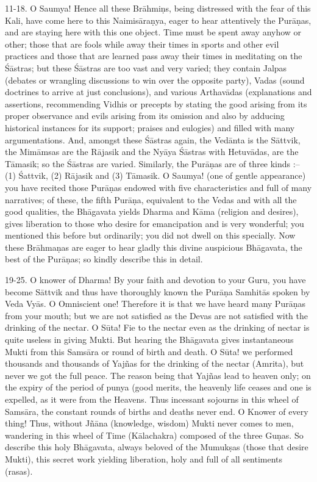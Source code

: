 11-18. O Saumya! Hence all these Br\=ahmi\d{n}s, being distressed with the fear of this Kali, have come here to this Naimis\=ara\d{n}ya, eager to hear attentively the Pur\=a\d{n}as, and are staying here with this one object. Time must be spent away anyhow or other; those that are fools while away their times in sports and other evil practices and those that are learned pass away their times in meditating on the \'S\=astras; but these \'S\=astras are too vast and very varied; they contain Jalpas (debates or wrangling discussions to win over the opposite party), Vadas (sound doctrines to arrive at just conclusions), and various Arthav\=adas (explanations and assertions, recommending Vidhis or precepts by stating the good arising from its proper observance and evils arising from its omission and also by adducing historical instances for its support; praises and eulogies) and filled with many argumentations. And, amongst these \'S\=astras again, the Ved\=anta is the S\=attvik, the Mim\=amsas are the R\=ajasik and the Ny\=aya \'S\=astras with Hetuv\=adas, are the T\=amasik; so the \'S\=astras are varied. Similarly, the Pur\=a\d{n}as are of three kinds :-- (1) \'Sattvik, (2) R\=ajasik and (3) T\=amasik. O Saumya! (one of gentle appearance) you have recited those Pur\=a\d{n}as endowed with five characteristics and full of many narratives; of these, the fifth Pur\=a\d{n}a, equivalent to the Vedas and with all the good qualities, the Bh\=agavata yields Dharma and K\=ama (religion and desires), gives liberation to those who desire for emancipation and is very wonderful; you mentioned this before but ordinarily; you did not dwell on this specially. Now these Br\=ahma\d{n}as are eager to hear gladly this divine auspicious Bh\=agavata, the best of the Pur\=a\d{n}as; so kindly describe this in detail.

19-25. O knower of Dharma! By your faith and devotion to your Guru, you have become S\=attvik and thus have thoroughly known the Pur\=a\d{n}a Samhit\=as spoken by Veda Vy\=as. O Omniscient one! Therefore it is that we have heard many Pur\=a\d{n}as from your mouth; but we are not satisfied as the Devas are not satisfied with the drinking of the nectar. O S\=uta! Fie to the nectar even as the drinking of nectar is quite useless in giving Mukti. But hearing the Bh\=agavata gives instantaneous Mukti from this Sams\=ara or round of birth and death. O S\=uta! we performed thousands and thousands of Yaj\~nas for the drinking of the nectar (Amrita), but never we got the full peace. The reason being that Yaj\~nas lead to heaven only; on the expiry of the period of punya (good merits, the heavenly life ceases and one is expelled, as it were from the Heavens. Thus incessant sojourns in this wheel of Sams\=ara, the constant rounds of births and deaths never end. O Knower of every thing! Thus, without J\~n\=ana (knowledge, wisdom) Mukti never comes to men, wandering in this wheel of Time (K\=alachakra) composed of the three Gu\d{n}as. So describe this holy Bh\=agavata, always beloved of the Mumuk\d{s}as (those that desire Mukti), this secret work yielding liberation, holy and full of all sentiments (rasas).

